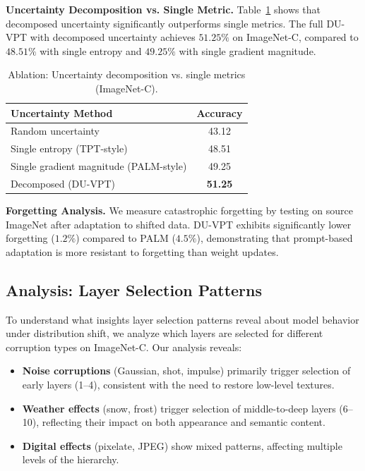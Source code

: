 \documentclass[11pt,a4paper]{article}
\begin{document}
\textbf{Uncertainty Decomposition vs. Single Metric.} Table~\ref{tab:uncertainty_ablation} shows that decomposed uncertainty significantly outperforms single metrics. The full DU-VPT with decomposed uncertainty achieves $51.25\%$ on ImageNet-C, compared to $48.51\%$ with single entropy and $49.25\%$ with single gradient magnitude.

\begin{table}[t]
\caption{Ablation: Uncertainty decomposition vs. single metrics (ImageNet-C).}
\label{tab:uncertainty_ablation}
\centering
\begin{tabular}{lc}
\toprule
Uncertainty Method & Accuracy \\
\midrule
Random uncertainty & 43.12 \\
Single entropy (TPT-style) & 48.51 \\
Single gradient magnitude (PALM-style) & 49.25 \\
Decomposed (DU-VPT) & \textbf{51.25} \\
\bottomrule
\end{tabular}
\end{table}

\textbf{Forgetting Analysis.} We measure catastrophic forgetting by testing on source ImageNet after adaptation to shifted data. DU-VPT exhibits significantly lower forgetting ($1.2\%$) compared to PALM ($4.5\%$), demonstrating that prompt-based adaptation is more resistant to forgetting than weight updates.

\subsection{Analysis: Layer Selection Patterns}

To understand what insights layer selection patterns reveal about model behavior under distribution shift, we analyze which layers are selected for different corruption types on ImageNet-C. Our analysis reveals:

\begin{itemize}
    \item \textbf{Noise corruptions} (Gaussian, shot, impulse) primarily trigger selection of early layers (1--4), consistent with the need to restore low-level textures.
    \item \textbf{Weather effects} (snow, frost) trigger selection of middle-to-deep layers (6--10), reflecting their impact on both appearance and semantic content.
    \item \textbf{Digital effects} (pixelate, JPEG) show mixed patterns, affecting multiple levels of the hierarchy.
\end{itemize}
\end{document}
